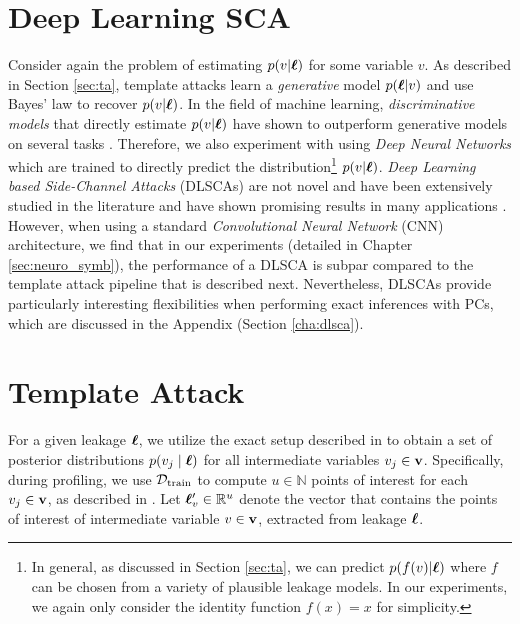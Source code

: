 \section{Deep Learning SCA}
Consider again the problem of estimating $p(v | \boldsymbol{\ell})$ for some variable $v$. As described in Section \ref{sec:ta}, template attacks learn a \emph{generative} model $p(\boldsymbol{\ell} | v)$ and use Bayes' law to recover $p(v | \boldsymbol{\ell})$. In the field of machine learning, \emph{discriminative models} that directly estimate $p(v | \boldsymbol{\ell})$ have shown to outperform generative models on several tasks \cite{gen_vs_disc, crf}. Therefore, we also experiment with using \emph{Deep Neural Networks} which are trained to directly predict the distribution\footnote{In general, as discussed in Section \ref{sec:ta}, we can predict $p(f(v) | \boldsymbol{\ell})$ where $f$ can be chosen from a variety of plausible leakage models. In our experiments, we again only consider the identity function $f(x) = x$ for simplicity.} $p(v | \boldsymbol{\ell})$. \emph{Deep Learning based Side-Channel Attacks} (DLSCAs) are not novel and have been extensively studied in the literature and have shown promising results in many applications \cite{dlsca_ascad, breaking_free, dlsca_in_practice, dlsca_aes, dlsca_defcon}. However, when using a standard \emph{Convolutional Neural Network} (CNN) architecture, we find that in our experiments (detailed in Chapter \ref{sec:neuro_symb}), the performance of a DLSCA is subpar compared to the template attack pipeline that is described next. Nevertheless, DLSCAs provide particularly interesting flexibilities when performing exact inferences with PCs, which are discussed in the Appendix (Section \ref{cha:dlsca}).


\section{Template Attack}
\label{sec:ta_application}
For a given leakage $\boldsymbol{\ell}$, we utilize the exact setup described in \cite{5min} to obtain a set of posterior distributions $p(v_j \mid \boldsymbol{\ell})$ for all intermediate variables $v_j \in \mathbf{v}$. Specifically, during profiling, we use $\mathcal{D}_{\text{train}}$ to compute $u \in \mathbb{N}$ points of interest for each $v_j \in \mathbf{v}$, as described in \cite{5min}. Let $\boldsymbol{\ell}'_v \in \mathbb{R}^{u}$ denote the vector that contains the points of interest of intermediate variable $v \in \mathbf{v}$, extracted from leakage $\boldsymbol{\ell}$.

